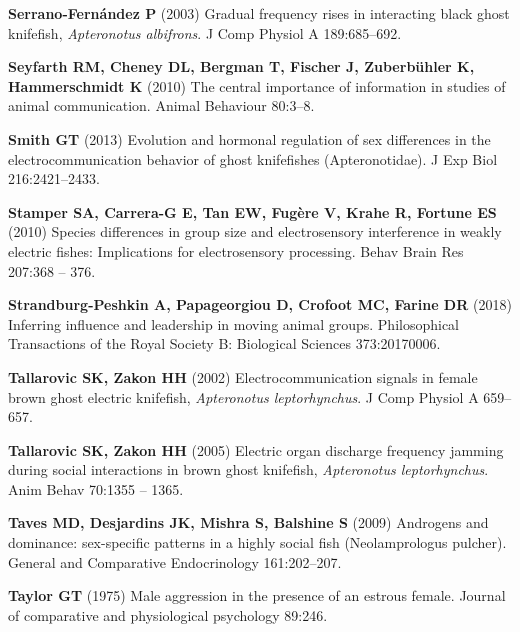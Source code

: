 \documentclass[vruler,JEB]{COB}%
\begin{document}
\begin{thebibliography}{70}
\textbf{Serrano-Fern{\'a}ndez P} (2003) Gradual frequency rises in interacting black
  ghost knifefish, \textit{Apteronotus albifrons}.
 J Comp Physiol A 189:685--692.

\textbf{Seyfarth RM, Cheney DL, Bergman T, Fischer J, Zuberb{\"u}hler K, Hammerschmidt
  K} (2010) The central importance of information in studies of animal
  communication.
 Animal Behaviour 80:3--8.

\textbf{Smith GT} (2013) Evolution and hormonal regulation of sex differences in the
  electrocommunication behavior of ghost knifefishes (Apteronotidae).
 J Exp Biol 216:2421--2433.

\textbf{Stamper SA, Carrera-G E, Tan EW, Fug\`ere V, Krahe R, Fortune ES} (2010) Species
  differences in group size and electrosensory interference in weakly electric
  fishes: Implications for electrosensory processing.
 Behav Brain Res 207:368 -- 376.

\textbf{Strandburg-Peshkin A, Papageorgiou D, Crofoot MC, Farine DR} (2018) Inferring
  influence and leadership in moving animal groups.
 Philosophical Transactions of the Royal Society B: Biological
  Sciences 373:20170006.

\textbf{Tallarovic SK, Zakon HH} (2002) Electrocommunication signals in female brown
  ghost electric knifefish, \textit{Apteronotus leptorhynchus}.
 J Comp Physiol A 659--657.

\textbf{Tallarovic SK, Zakon HH} (2005) Electric organ discharge frequency jamming
  during social interactions in brown ghost knifefish, \textit{Apteronotus
  leptorhynchus}.
 Anim Behav 70:1355 -- 1365.

\textbf{Taves MD, Desjardins JK, Mishra S, Balshine S} (2009) Androgens and dominance:
  sex-specific patterns in a highly social fish (Neolamprologus pulcher).
 General and Comparative Endocrinology 161:202--207.

\textbf{Taylor GT} (1975) Male aggression in the presence of an estrous female.
 Journal of comparative and physiological psychology 89:246.


\end{thebibliography}
\end{document}

